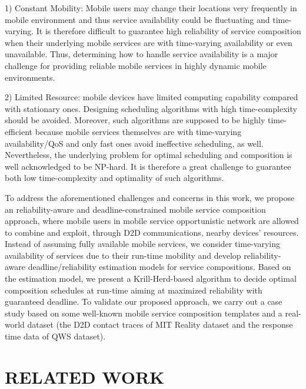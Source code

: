 \documentclass[journal]{IEEEtran}
\begin{document}
1) Constant Mobility: Mobile users may change their locations very frequently in mobile environment and thus service availability could be fluctuating and time-varying. It is therefore difficult to guarantee high reliability of service composition when their underlying mobile services are with time-varying availability or even unavailable. Thus, determining how to handle service availability is a major challenge for providing reliable mobile services in highly dynamic mobile environments.

2) Limited Resource: mobile devices have limited computing capability compared with stationary ones. Designing scheduling algorithms with high time-complexity should be avoided.
Moreover, such algorithms are supposed to be highly time-efficient because mobile services themselves are with time-varying availability/QoS and only fast ones avoid ineffective scheduling, as well. 
Nevertheless, the underlying problem for optimal scheduling and composition is well acknowledged to be NP-hard. It is therefore a great challenge to guarantee both low time-complexity and optimality of such algorithms.

To address the aforementioned challenges and concerns in this work, we propose an reliability-aware and deadline-constrained mobile service composition approach, where mobile users in mobile service opportunistic network are allowed to combine and exploit, through D2D communications, nearby devices' resources. Instead of assuming fully available mobile services, we consider time-varying availability of services due to their run-time mobility and develop reliability-aware deadline/reliability estimation models for service compositions. Based on the estimation model, we present a Krill-Herd-based algorithm to decide optimal composition schedules at run-time aiming at maximized reliability with guaranteed deadline. To validate our proposed approach, we carry out a case study based on some well-known mobile service composition templates and a real-world dataset (the D2D contact traces of MIT Reality dataset and the response time data of QWS dataset).

\section{RELATED WORK}
\end{document}
